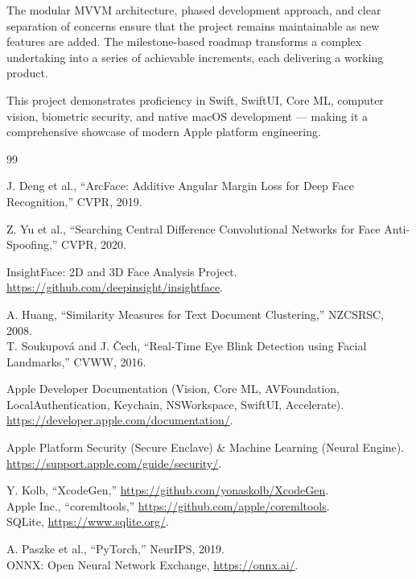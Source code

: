 \documentclass[12pt,a4paper]{report}
\begin{document}
The modular MVVM architecture, phased development approach, and clear separation of concerns ensure that the project remains maintainable as new features are added. The milestone-based roadmap transforms a complex undertaking into a series of achievable increments, each delivering a working product.

This project demonstrates proficiency in Swift, SwiftUI, Core ML, computer vision, biometric security, and native macOS development --- making it a comprehensive showcase of modern Apple platform engineering.

\renewcommand{\bibname}{References}

\begin{thebibliography}{99}

J. Deng et al., ``ArcFace: Additive Angular Margin Loss for Deep Face Recognition,'' CVPR, 2019.

Z. Yu et al., ``Searching Central Difference Convolutional Networks for Face Anti-Spoofing,'' CVPR, 2020.

InsightFace: 2D and 3D Face Analysis Project. \url{https://github.com/deepinsight/insightface}.

A. Huang, ``Similarity Measures for Text Document Clustering,'' NZCSRSC, 2008. \\
T. Soukupov\'{a} and J. \v{C}ech, ``Real-Time Eye Blink Detection using Facial Landmarks,'' CVWW, 2016.

Apple Developer Documentation (Vision, Core ML, AVFoundation, LocalAuthentication, Keychain, NSWorkspace, SwiftUI, Accelerate). \url{https://developer.apple.com/documentation/}.

Apple Platform Security (Secure Enclave) \& Machine Learning (Neural Engine). \url{https://support.apple.com/guide/security/}.

Y. Kolb, ``XcodeGen,'' \url{https://github.com/yonaskolb/XcodeGen}. \\
Apple Inc., ``coremltools,'' \url{https://github.com/apple/coremltools}. \\
SQLite, \url{https://www.sqlite.org/}.

A. Paszke et al., ``PyTorch,'' NeurIPS, 2019. \\
ONNX: Open Neural Network Exchange, \url{https://onnx.ai/}.

\end{thebibliography}
\end{document}
